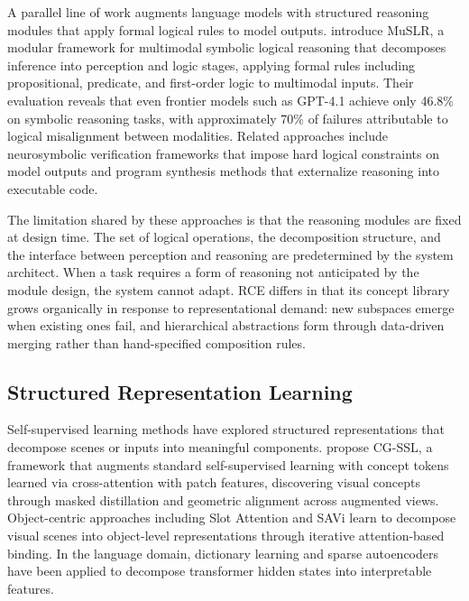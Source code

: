 \documentclass[11pt]{article}
\begin{document}
A parallel line of work augments language models with structured reasoning modules that apply formal logical rules to model outputs. \citet{wang2025muslr} introduce MuSLR, a modular framework for multimodal symbolic logical reasoning that decomposes inference into perception and logic stages, applying formal rules including propositional, predicate, and first-order logic to multimodal inputs. Their evaluation reveals that even frontier models such as GPT-4.1 achieve only 46.8\% on symbolic reasoning tasks, with approximately 70\% of failures attributable to logical misalignment between modalities. Related approaches include neurosymbolic verification frameworks \cite{nye2021scratchpad} that impose hard logical constraints on model outputs and program synthesis methods \cite{chen2021codex} that externalize reasoning into executable code.

The limitation shared by these approaches is that the reasoning modules are fixed at design time. The set of logical operations, the decomposition structure, and the interface between perception and reasoning are predetermined by the system architect. When a task requires a form of reasoning not anticipated by the module design, the system cannot adapt. RCE differs in that its concept library grows organically in response to representational demand: new subspaces emerge when existing ones fail, and hierarchical abstractions form through data-driven merging rather than hand-specified composition rules.

\subsection{Structured Representation Learning}

Self-supervised learning methods have explored structured representations that decompose scenes or inputs into meaningful components. \citet{huang2025cgssl} propose CG-SSL, a framework that augments standard self-supervised learning with concept tokens learned via cross-attention with patch features, discovering visual concepts through masked distillation and geometric alignment across augmented views. Object-centric approaches including Slot Attention \cite{locatello2020slotattention} and SAVi \cite{kipf2022savi} learn to decompose visual scenes into object-level representations through iterative attention-based binding. In the language domain, dictionary learning and sparse autoencoders \cite{bricken2023monosemanticity} have been applied to decompose transformer hidden states into interpretable features.
\end{document}
